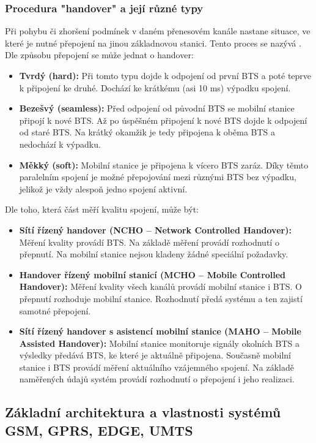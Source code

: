 		\subsubsection{Procedura "handover" a její různé typy}
			Při pohybu či zhoršení podmínek v daném přenesovém kanále nastane situace, ve které je nutné přepojení na jinou základnovou stanici. Tento proces se nazývá .\\
			Dle způsobu přepojení se může jednat o handover:
			\begin{itemize}
				\item \textbf{Tvrdý (hard):} Při tomto typu dojde k odpojení od první BTS a poté teprve k připojení ke druhé. Dochází ke krátkému (asi 10 ms) výpadku spojení.
				\item \textbf{Bezešvý (seamless):} Před odpojení od původní BTS se mobilní stanice připojí k nové BTS. Až po úspěšném připojení k nové BTS dojde k odpojení od staré BTS. Na krátký okamžik je tedy připojena k oběma BTS a nedochází k výpadku.
				\item \textbf{Měkký (soft):} Mobilní stanice je připojena k vícero BTS zaráz. Díky těmto paralelním spojení je možné přepojování mezi různými BTS bez výpadku, jelikož je vždy alespoň jedno spojení aktivní.
			\end{itemize}
			Dle toho, která část měří kvalitu spojení, může být:
			\begin{itemize}
				\item \textbf{Sítí řízený handover (NCHO – Network Controlled Handover):} Měření kvality provádí BTS. Na základě měření provádí rozhodnutí o přepnutí. Na mobilní stanice nejsou kladeny žádné speciální požadavky.
				\item \textbf{Handover řízený mobilní stanicí (MCHO – Mobile Controlled Handover):} Měření kvality všech kanálů provádí mobilní stanice i BTS. O přepnutí rozhoduje mobilní stanice. Rozhodnutí předá systému a ten zajistí samotné přepojení.
				\item \textbf{Sítí řízený handover s asistencí mobilní stanice (MAHO – Mobile Assisted Handover):} Mobilní stanice monitoruje signály okolních BTS a výsledky předává BTS, ke které je aktuálně připojena. Současně mobilní stanice i BTS provádí měření aktuálního vzájemného spojení. Na základě naměřených údajů systém provádí rozhodnutí o přepojení i jeho realizaci.
			\end{itemize}
	
	\subsection{Základní architektura a vlastnosti systémů GSM, GPRS, EDGE, UMTS}
